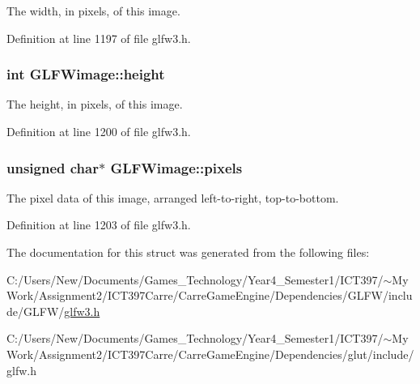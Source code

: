The width, in pixels, of this image. 

Definition at line 1197 of file glfw3.h.\hypertarget{struct_g_l_f_wimage_0b7d95368f0c80d5e5c9875057c7dbec}{
\subsubsection[height]{\setlength{\rightskip}{0pt plus 5cm}int {\bf GLFWimage::height}}}
\label{struct_g_l_f_wimage_0b7d95368f0c80d5e5c9875057c7dbec}


The height, in pixels, of this image. 

Definition at line 1200 of file glfw3.h.\hypertarget{struct_g_l_f_wimage_0c532a5c2bb715555279b7817daba0fb}{
\subsubsection[pixels]{\setlength{\rightskip}{0pt plus 5cm}unsigned char$\ast$ {\bf GLFWimage::pixels}}}
\label{struct_g_l_f_wimage_0c532a5c2bb715555279b7817daba0fb}


The pixel data of this image, arranged left-to-right, top-to-bottom. 

Definition at line 1203 of file glfw3.h.

The documentation for this struct was generated from the following files:\begin{CompactItemize}
\item 
C:/Users/New/Documents/Games\_\-Technology/Year4\_\-Semester1/ICT397/$\sim$My Work/Assignment2/ICT397Carre/CarreGameEngine/Dependencies/GLFW/include/GLFW/\hyperlink{glfw3_8h}{glfw3.h}\item 
C:/Users/New/Documents/Games\_\-Technology/Year4\_\-Semester1/ICT397/$\sim$My Work/Assignment2/ICT397Carre/CarreGameEngine/Dependencies/glut/include/glfw.h\end{CompactItemize}
